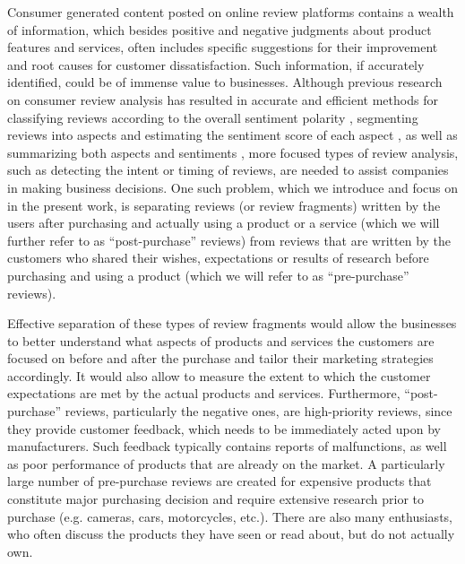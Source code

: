 \documentclass[runningheads,a4paper]{llncs}
\begin{document}
Consumer generated content posted on online review platforms contains a wealth of information, which besides positive and negative judgments about product features and services,
often includes specific suggestions for their improvement and root causes for customer dissatisfaction. Such information, if accurately identified, could be of immense value to
businesses. Although previous research on consumer review analysis has resulted in accurate and efficient methods for classifying reviews according to the overall sentiment
polarity \cite{Pang2008Book}, segmenting reviews into aspects and estimating the sentiment score of each aspect \cite{Yu2011AspectRank}, as well as summarizing both aspects
and sentiments \cite{Hu2004Mining} \cite{Titov2008TextAspect} \cite{Yang2015USTM}, more focused types of review analysis, such as detecting the intent or timing of reviews, are
needed to assist companies in making business decisions. One such problem, which we introduce and focus on in the present work, is separating reviews (or review fragments) written
by the users after purchasing and actually using a product or a service (which we will further refer to as ``post-purchase'' reviews) from reviews that are written by the customers
who shared their wishes, expectations or results of research before purchasing and using a product (which we will refer to as ``pre-purchase'' reviews).

Effective separation of these types of review fragments would allow the businesses to better understand what aspects of products and services the customers are focused on before
and after the purchase and tailor their marketing strategies accordingly. It would also allow to measure the extent to which the customer expectations are met by the actual
products and services. Furthermore, ``post-purchase'' reviews, particularly the negative ones, are high-priority reviews, since they provide customer feedback, which needs to be
immediately acted upon by manufacturers. Such feedback typically contains reports of malfunctions, as well as poor performance of products that are already on the market. A
particularly large number of pre-purchase reviews are created for expensive products that constitute major purchasing decision and require extensive research prior to purchase
(e.g. cameras, cars, motorcycles, etc.). There are also many enthusiasts, who often discuss the products they have seen or read about, but do not actually own.
\end{document}

